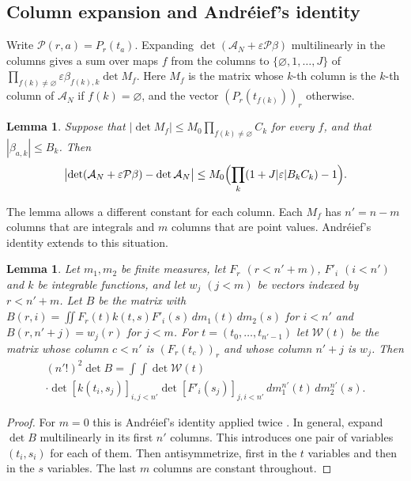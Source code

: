\documentclass[11pt]{amsart}
\newtheorem{lemma}[theorem]{Lemma}
\theoremstyle{definition}
\theoremstyle{remark}
\numberwithin{equation}{section}
\newcommand{\cA}{\mathcal A}
\begin{document}
\subsection{Column expansion and Andr\'eief's identity}\label{ssec:andreief}
Write $\mathcal P(r,a)=P_r(t_a)$. Expanding $\det(\cA_N+\varepsilon\mathcal P\beta)$ multilinearly in the
columns gives a sum over maps $f$ from the columns to $\{\varnothing,1,\ldots,J\}$ of
$\prod_{f(k)\ne\varnothing}\varepsilon\beta_{f(k),k}\det M_f$. Here $M_f$ is the matrix whose $k$-th column is
the $k$-th column of $\cA_N$ if $f(k)=\varnothing$, and the vector $(P_r(t_{f(k)}))_r$ otherwise.

\begin{lemma}\label{lem:expansion}
Suppose that $|\det M_f|\le M_0\prod_{f(k)\ne\varnothing}C_k$ for every $f$, and that $|\beta_{a,k}|\le B_k$.
Then
\[
 \bigl|\det(\cA_N+\varepsilon\mathcal P\beta)-\det\cA_N\bigr|\le M_0\Bigl(\prod_k(1+J|\varepsilon|B_kC_k)-1\Bigr).
\]
\end{lemma}

The lemma allows a different constant for each column. Each $M_f$ has $n'=n-m$ columns that are integrals
and $m$ columns that are point values. Andr\'eief's identity extends to this situation.

\begin{lemma}\label{lem:andreief}
Let $m_1,m_2$ be finite measures, let $F_r$ $(r<n'+m)$, $F'_i$ $(i<n')$ and $k$ be integrable functions, and let
$w_j$ $(j<m)$ be vectors indexed by $r<n'+m$. Let $B$ be the matrix with
$B(r,i)=\iint F_r(t)k(t,s)F'_i(s)\,dm_1(t)\,dm_2(s)$ for $i<n'$ and $B(r,n'+j)=w_j(r)$ for $j<m$. For
$t=(t_0,\ldots,t_{n'-1})$ let $\mathcal W(t)$ be the matrix whose column $c<n'$ is $(F_r(t_c))_r$ and whose column $n'+j$ is
$w_j$. Then
\begin{multline*}
 (n'!)^2\det B=\int\!\!\int\det\mathcal W(t)\\
 \cdot\det[k(t_i,s_j)]_{i,j<n'}\det[F'_i(s_j)]_{j,i<n'}\,dm_1^{n'}(t)\,dm_2^{n'}(s).
\end{multline*}
\end{lemma}

\begin{proof}
For $m=0$ this is Andr\'eief's identity applied twice \cite{Forrester2018Andreief}. In general, expand
$\det B$ multilinearly in its first $n'$ columns. This introduces one pair of variables $(t_i,s_i)$ for each
of them. Then antisymmetrize, first in the $t$ variables and then in the $s$ variables. The last $m$ columns
are constant throughout.
\end{proof}
\end{document}
